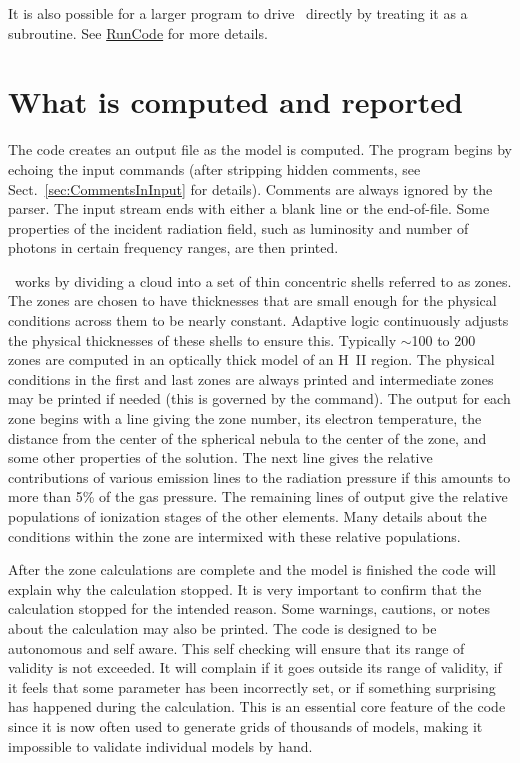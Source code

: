 It is also possible for a larger program to drive \Cloudy\ directly by
treating it as a subroutine. 
See \href{https://gitlab.nublado.org/cloudy/cloudy/-/wikis/RunCode}{RunCode} for more details.

\section{What is computed and reported}

The code creates an output file as the model is computed.
The program begins by echoing the input commands (after stripping hidden
comments, see Sect.~\ref{sec:CommentsInInput} for details).  Comments are
always ignored by the parser.  The input stream ends with either a blank line or
the end-of-file.  Some properties of the incident radiation field, such
as luminosity and number of photons in certain frequency ranges, are then
printed.

\Cloudy\ works by dividing a cloud into a set of thin concentric shells
referred to as zones. The zones are chosen to have thicknesses that are
small enough for the physical conditions across them to be nearly constant.
Adaptive logic continuously adjusts the physical thicknesses of these shells
to ensure this.  Typically $\sim$100 to 200 zones are computed in an optically
thick model of an H~II region.  The physical conditions in the first and
last zones are always printed and intermediate zones may be printed if needed
(this is governed by the  command).
The output for each zone begins with a line giving the zone number, its
electron temperature, the distance from the center of the spherical nebula
to the center of the zone, and some other properties of the solution.  The
next line gives the relative contributions of various emission lines to
the radiation pressure if this amounts to more than 5\% of the gas pressure.
The remaining lines of output give the relative populations of
ionization stages of the other elements.
Many details about the conditions within the zone are
intermixed with these relative populations.

After the zone calculations are complete and the model is finished the
code will explain why the calculation stopped.  It is very important to
confirm that the calculation stopped for the intended reason.  Some warnings,
cautions, or notes about the calculation may also be printed.  The code
is designed to be autonomous and self aware.  This self checking will ensure
that its range of validity is not exceeded. It will complain if it goes
outside its range of validity, if it feels that some parameter has been
incorrectly set, or if something surprising has happened during the
calculation.  This is an essential core feature of the code since it is
now often used to generate grids of thousands of models, making it impossible
to validate individual models by hand.

